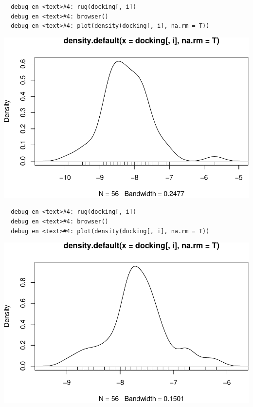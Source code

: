 \documentclass[12pt,twoside]{reedthesis}
\begin{document}
  \begin{verbatim}
  debug en <text>#4: rug(docking[, i])
  debug en <text>#4: browser()
  debug en <text>#4: plot(density(docking[, i], na.rm = T))
  \end{verbatim}
  
  \begin{center}\includegraphics{tesis_files/figure-latex/johan-11} \end{center}
  
  \begin{verbatim}
  debug en <text>#4: rug(docking[, i])
  debug en <text>#4: browser()
  debug en <text>#4: plot(density(docking[, i], na.rm = T))
  \end{verbatim}
  
  \begin{center}\includegraphics{tesis_files/figure-latex/johan-12} \end{center}
  
\end{document}
